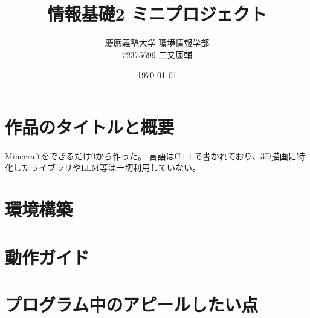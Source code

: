\documentclass[dvipdfmx]{jsarticle}
\title{情報基礎2 ミニプロジェクト}
\author{
    慶應義塾大学 環境情報学部 \\
    72375699 二又康輔
}
\date{\today}
\begin{document}
\maketitle

\section{作品のタイトルと概要}
Minecraftをできるだけ0から作った。
言語はC++で書かれており、3D描画に特化したライブラリやLLM等は一切利用していない。

\section{環境構築}

\section{動作ガイド}

\section{プログラム中のアピールしたい点}
\end{document}
